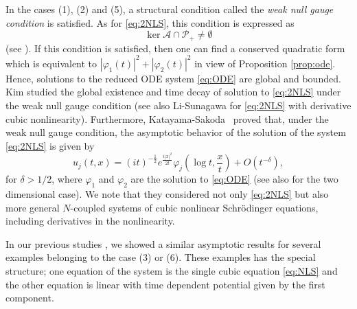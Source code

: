 \documentclass[11pt,a4paper,twosides]{amsart}
\theoremstyle{plain}
\theoremstyle{remark}
\numberwithin{equation}{section}
\theoremstyle{definition}
\newcommand{\1}{{\bf 1}_{\{|x| < |t|\}}}
\renewcommand{\phi}{\varphi}
\begin{document}
In the cases (1), (2) and (5),
a structural condition called the \emph{weak null gauge condition} is satisfied. 
As for \eqref{eq:2NLS}, this condition is expressed as
\begin{equation}\label{eq:WNGC}
	\ker \mathscr{A} \cap \mathcal{P}_+ \neq \emptyset
\end{equation}
(see \cite{Ma2}).
If this condition is satisfied, 
then one can find a conserved quadratic form which is equivalent to
$|\varphi_1(t)|^2 + |\varphi_2(t)|^2$ in view of Proposition \ref{prop:ode}.
Hence, solutions to the reduced ODE system  \eqref{eq:ODE} are global and bounded. 
Kim \cite{Kim} studied the global existence and time decay of solution to 
\eqref{eq:2NLS} under the weak null gauge condition (see also Li-Sunagawa \cite{LiSu,LiSu2} 
for \eqref{eq:2NLS} with derivative cubic nonlinearity). Furthermore, 
Katayama-Sakoda~\cite{KaSa} 
proved that, under the weak null gauge condition, the 
asymptotic behavior of the solution of the system 
\eqref{eq:2NLS} is given by
\begin{equation}
  u_j(t,x) = (it)^{-\frac12}e^{\frac{i|x|^2}{2t}}\phi_j\left(\log t, \frac{x}{t}\right) + O(t^{-\delta}),
\end{equation}
for $\delta >1/2$, where $\phi_1$ and $\phi_2$ are the solution to \eqref{eq:ODE} (see also \cite{HLN} 
for the two dimensional case). 
We note that they
considered not only \eqref{eq:2NLS} but also
 more general $N$-coupled systems of cubic nonlinear Schr\"odinger equations, including 
derivatives in the nonlinearity.

In our previous studies \cite{MaSeUr2,KiMaSeUr},
we showed a similar asymptotic results for several examples belonging to the case (3) or (6).
These examples has the special structure;
one equation of the system is the single cubic equation \eqref{eq:NLS} and the other equation is linear with time dependent potential given by the first component.
\end{document}
